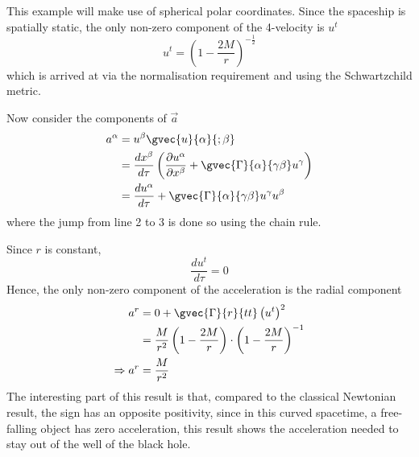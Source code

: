 This example will make use of spherical polar coordinates. Since the spaceship is spatially static, the only non-zero component of the 4-velocity is $u^t$
$$ u^t = \left(1 - \frac{2M}{r}\right)^{-\frac{1}{2}} $$
which is arrived at via the normalisation requirement and using the Schwartzchild metric. \par
Now consider the components of $\vec{a}$
\begin{align*}
    a^\alpha & = u^\beta \gvec{u}{\alpha}{;\beta} \\
    & = \frac{dx^\beta}{d\tau} \left(\frac{\partial u^\alpha}{\partial x^\beta} + \gvec{\Gamma}{\alpha}{\gamma \beta} u^\gamma \right) \\
    & = \frac{du^\alpha}{d\tau} + \gvec{\Gamma}{\alpha}{\gamma \beta} u^\gamma u^\beta
\end{align*}
where the jump from line 2 to 3 is done so using the chain rule. \par Since $r$ is constant, $$ \frac{du^t}{d\tau} = 0 $$
Hence, the only non-zero component of the acceleration is the radial component
\begin{align*}
    a^r & = 0 + \gvec{\Gamma}{r}{tt} \left(u^t\right)^2 \\ 
    & = \frac{M}{r^2} \left(1- \frac{2M}{r}\right) \cdot \left(1 - \frac{2M}{r} \right)^{-1} \\
    \Rightarrow a^r & = \frac{M}{r^2}
\end{align*}
The interesting part of this result is that, compared to the classical Newtonian result, the sign has an opposite positivity, since in this curved spacetime, a free-falling object has zero acceleration, this result shows the acceleration needed to stay out of the well of the black hole.

